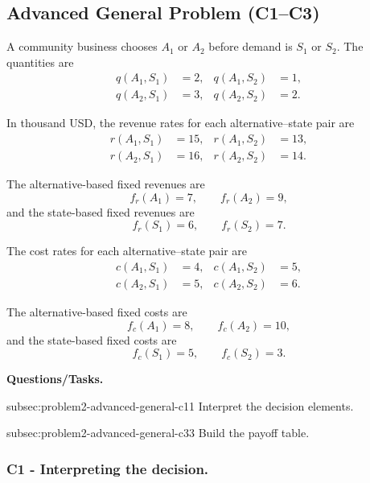 
\subsection{Advanced General Problem (C1--C3)}
\label{sec:problem2-advanced-general-c1-c3}

A community business chooses \(A_1\) or \(A_2\) before demand is \(S_1\) or
\(S_2\). The quantities are
\[
\begin{aligned}
	q(A_1,S_1)&=2,
	&
	q(A_1,S_2)&=1,
	\\
	q(A_2,S_1)&=3,
	&
	q(A_2,S_2)&=2.
\end{aligned}
\]

In thousand USD, the revenue rates for each alternative--state pair are
\[
\begin{aligned}
	r(A_1,S_1)&=15,
	&
	r(A_1,S_2)&=13,
	\\
	r(A_2,S_1)&=16,
	&
	r(A_2,S_2)&=14.
\end{aligned}
\]

The alternative-based fixed revenues are
\[
f_r(A_1)=7,
\qquad
f_r(A_2)=9,
\]
and the state-based fixed revenues are
\[
f_r(S_1)=6,
\qquad
f_r(S_2)=7.
\]

The cost rates for each alternative--state pair are
\[
\begin{aligned}
	c(A_1,S_1)&=4,
	&
	c(A_1,S_2)&=5,
	\\
	c(A_2,S_1)&=5,
	&
	c(A_2,S_2)&=6.
\end{aligned}
\]

The alternative-based fixed costs are
\[
f_c(A_1)=8,
\qquad
f_c(A_2)=10,
\]
and the state-based fixed costs are
\[
f_c(S_1)=5,
\qquad
f_c(S_2)=3.
\]

\textbf{Questions/Tasks.}
\begin{enumerate}
	\CriterionTask
	{subsec:problem2-advanced-general-c1}{1}
	{Interpret the decision elements.}
	
	\CriterionTask
	{subsec:problem2-advanced-general-c3}{3}
	{Build the payoff table.}
\end{enumerate}

\subsubsection*{C1 - Interpreting the decision.}
\label{subsec:problem2-advanced-general-c1}

